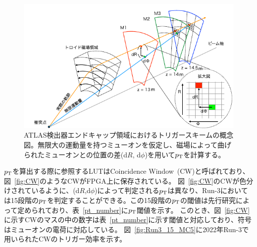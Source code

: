 \begin{figure}[tb]
  \centering
  \includegraphics[clip, width=15cm]{fig/3/akatuka_mt_trigger_sceme.pdf}
  \caption{ATLAS検出器エンドキャップ領域におけるトリガースキームの概念図\cite{article:akatsuka-mron}。無限大の運動量を持つミューオンを仮定し、磁場によって曲げられたミューオンとの位置の差(d$R$, d$\phi$)を用いて$p_{\rm{T}}$を計算する。}
  \label{fig:trigger-scheme}
\end{figure}


$p_{\rm{T}}$を算出する際に参照するLUTはCoincidence Window~(CW)と呼ばれており、図~\ref{fig:CW}のようなCWがFPGA上に保存されている。
図~\ref{fig:CW}のCWが色分けされているように、(d$R$,d$\phi$)によって判定される$p_{\rm{T}}$は異なり、Run-3においては15段階の$p_{\rm{T}}$を判定することができる。この15段階の$p_{\rm{T}}$の閾値は先行研究\cite{article:shiomi-mron}によって定められており、表~\ref{pt_number}に$p_{\rm{T}}$閾値を示す。
このとき、図~\ref{fig:CW}に示すCWのマスの中の数字は表~\ref{pt_number}に示す閾値と対応しており、符号はミューオンの電荷に対応している。
図~\ref{fig:Run3_15_MC5}に2022年Run-3で用いられたCWのトリガー効率を示す。

